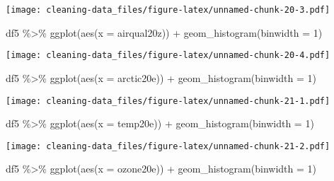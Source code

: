 \documentclass[
]{article}
\newenvironment{Shaded}{\begin{snugshade}}{\end{snugshade}}
\newcommand{\AttributeTok}[1]{\textcolor[rgb]{0.77,0.63,0.00}{#1}}
\newcommand{\DecValTok}[1]{\textcolor[rgb]{0.00,0.00,0.81}{#1}}
\newcommand{\FunctionTok}[1]{\textcolor[rgb]{0.00,0.00,0.00}{#1}}
\newcommand{\NormalTok}[1]{#1}
\newcommand{\SpecialCharTok}[1]{\textcolor[rgb]{0.00,0.00,0.00}{#1}}
\begin{document}
\texttt{[image: cleaning-data\_files/figure-latex/unnamed-chunk-20-3.pdf]}

\begin{Shaded}
\begin{Highlighting}[]
\NormalTok{df5 }\SpecialCharTok{\%\textgreater{}\%}
  \FunctionTok{ggplot}\NormalTok{(}\FunctionTok{aes}\NormalTok{(}\AttributeTok{x =}\NormalTok{ airqual20z)) }\SpecialCharTok{+}
  \FunctionTok{geom\_histogram}\NormalTok{(}\AttributeTok{binwidth =} \DecValTok{1}\NormalTok{)}
\end{Highlighting}
\end{Shaded}

\texttt{[image: cleaning-data\_files/figure-latex/unnamed-chunk-20-4.pdf]}

\begin{Shaded}
\begin{Highlighting}[]
\NormalTok{df5 }\SpecialCharTok{\%\textgreater{}\%}
  \FunctionTok{ggplot}\NormalTok{(}\FunctionTok{aes}\NormalTok{(}\AttributeTok{x =}\NormalTok{ arctic20e)) }\SpecialCharTok{+}
  \FunctionTok{geom\_histogram}\NormalTok{(}\AttributeTok{binwidth =} \DecValTok{1}\NormalTok{)}
\end{Highlighting}
\end{Shaded}

\texttt{[image: cleaning-data\_files/figure-latex/unnamed-chunk-21-1.pdf]}

\begin{Shaded}
\begin{Highlighting}[]
\NormalTok{df5 }\SpecialCharTok{\%\textgreater{}\%}
  \FunctionTok{ggplot}\NormalTok{(}\FunctionTok{aes}\NormalTok{(}\AttributeTok{x =}\NormalTok{ temp20e)) }\SpecialCharTok{+}
  \FunctionTok{geom\_histogram}\NormalTok{(}\AttributeTok{binwidth =} \DecValTok{1}\NormalTok{)}
\end{Highlighting}
\end{Shaded}

\texttt{[image: cleaning-data\_files/figure-latex/unnamed-chunk-21-2.pdf]}

\begin{Shaded}
\begin{Highlighting}[]
\NormalTok{df5 }\SpecialCharTok{\%\textgreater{}\%}
  \FunctionTok{ggplot}\NormalTok{(}\FunctionTok{aes}\NormalTok{(}\AttributeTok{x =}\NormalTok{ ozone20e)) }\SpecialCharTok{+}
  \FunctionTok{geom\_histogram}\NormalTok{(}\AttributeTok{binwidth =} \DecValTok{1}\NormalTok{)}
\end{Highlighting}
\end{Shaded}
\end{document}
